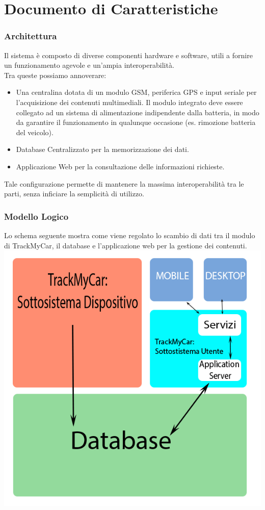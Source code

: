 \documentclass[a4paper,12pt]{beamer}
\begin{document}
\section{Documento di Caratteristiche}
\begin{frame}
\frametitle{Architettura}
Il sistema è composto di diverse componenti hardware e software, utili a fornire un funzionamento agevole  e un'ampia interoperabilità. \\
Tra queste possiamo annoverare: 
\begin{itemize}
\item Una centralina dotata di un modulo GSM, periferica GPS e input seriale per l'acquisizione dei contenuti multimediali.  Il modulo integrato deve essere collegato ad un sistema di alimentazione indipendente dalla batteria, in modo da garantire il funzionamento in qualunque occasione (es. rimozione batteria del veicolo).
\item Database Centralizzato per la memorizzazione dei dati.
\item Applicazione Web per la consultazione delle informazioni richieste.
\end{itemize}

Tale configurazione permette di mantenere la massima interoperabilità tra le parti, senza inficiare la semplicità di utilizzo.
\end{frame}

\begin{frame}
\frametitle{Modello Logico}
Lo schema seguente mostra come viene regolato lo scambio di dati tra il modulo di TrackMyCar, il database e l'applicazione web per la gestione dei contenuti.\\

\includegraphics[scale=.3]{../IMG/ModLogico.png}
\end{frame}
\end{document}
